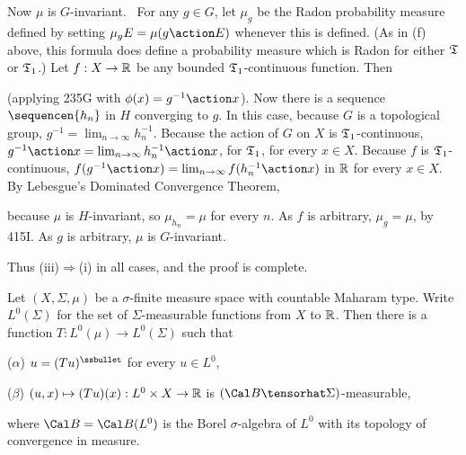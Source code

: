 {Now $\mu$ is $G$-invariant.   \Prf\ For any $g\in G$, let $\mu_g$ be the
Radon probability measure defined by setting $\mu_gE=\mu(g\action E)$
whenever this is defined.   (As in (f) above, this formula does define a
probability measure which is Radon for either $\frak T$ or $\frak T_1$.)
Let $f:X\to\Bbb R$ be any bounded $\frak T_1$-continuous function.
Then


\noindent (applying 235G with
$\phi(x)=g^{-1}\action x$).   Now there is
a sequence $\sequencen{h_n}$ in $H$ converging to $g$.   In this case,
because $G$ is a topological group, $g^{-1}=\lim_{n\to\infty}h_n^{-1}$.
Because the action of $G$ on $X$ is $\frak T_1$-continuous,
$g^{-1}\action x=\lim_{n\to\infty}h^{-1}_n\action x$, for $\frak T_1$,
for every $x\in X$.   Because $f$ is $\frak T_1$-continuous,
$f(g^{-1}\action x)=\lim_{n\to\infty}f(h_n^{-1}\action x)$ in $\Bbb R$
for every $x\in X$.   By Lebesgue's Dominated Convergence Theorem,


\noindent because $\mu$ is $H$-invariant, so $\mu_{h_n}=\mu$ for every
$n$.   As $f$ is arbitrary, $\mu_g=\mu$, by 415I.   As $g$ is arbitrary,
$\mu$ is $G$-invariant.\ \Qed

Thus (iii)$\Rightarrow$(i) in all cases, and the proof is complete.
}%

Let $(X,\Sigma,\mu)$ be a $\sigma$-finite measure
space with countable Maharam type.   Write $L^0(\Sigma)$ for the
set of $\Sigma$-measurable functions from $X$ to $\Bbb R$.
Then there is a function $T:L^0(\mu)\to L^0(\Sigma)$ such that

($\alpha$) $u=(Tu)^{\ssbullet}$ for every $u\in L^0$,

($\beta$) $(u,x)\mapsto(Tu)(x):L^0\times X\to\Bbb R$ is
$(\Cal B\tensorhat\Sigma)$-measurable,

\noindent where $\Cal B=\Cal B(L^0)$ is the Borel $\sigma$-algebra of
$L^0$ with its topology of convergence in measure.

